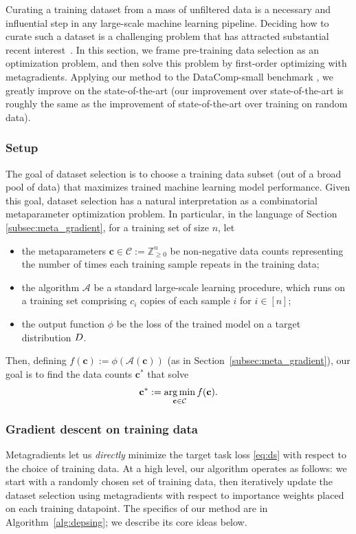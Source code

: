 Curating a training dataset from a mass of unfiltered data is a necessary and
influential step in any large-scale machine learning pipeline. Deciding how to
curate such a dataset is a challenging problem that has attracted substantial
recent
interest~\citep{fang2022data,abbas2023semdedup,engstrom2024dsdm,gadre2024datacomp}.
In this section, we frame pre-training data selection as an optimization
problem, and then solve this problem by first-order optimizing with
metagradients. Applying our method to the DataComp-small benchmark
\citep{gadre2024datacomp}, we greatly improve on the state-of-the-art (our
  improvement over state-of-the-art is roughly the same as the
improvement of state-of-the-art over training on random data).

\subsubsection{Setup}
The goal of {dataset selection} is to choose a training data subset (out of
a broad pool of data) that maximizes trained machine learning model
performance.
Given this goal,
dataset selection has a natural interpretation as a
combinatorial metaparameter optimization problem.
In particular, in the language of Section \ref{subsec:meta_gradient},
for a training set of size $n$, let
\begin{itemize}
  \item[(a)] the metaparameters $\mathbf{c} \in \mathcal{C} :=
    \mathbb{Z}_{\geq 0}^n$ be non-negative data counts representing
    the number of times each training sample repeats in the training data;
  \item[(b)] the algorithm $\mathcal{A}$ be a standard large-scale
    learning procedure, which runs on a training set
    comprising $c_i$ copies of each sample $i$ for $i \in [n]$;
  \item[(c)] the output function $\phi$ be the loss of the trained model on a target
    distribution $D{}$.
\end{itemize}
Then, defining $f(\mathbf{c}) := \phi(\mathcal{A}(\mathbf{c}))$ (as
in Section~\ref{subsec:meta_gradient}),
our goal is to find the data counts $\mathbf{c^*}$ that solve
\begin{equation}
  \label{eq:ds}
  \mathbf{c}^* := \operatorname*{arg\,min}_{\mathbf{c} \in \mathcal{C}} f(\mathbf{c}).
\end{equation}

\subsubsection{Gradient descent on training data}
\label{sec:gdod}
Metagradients let us \textit{directly} minimize the target task
loss \eqref{eq:ds}
with respect to the choice of training data.
At a high level, our algorithm operates as follows:
we start with a randomly chosen set of training data, then
iteratively update the dataset selection using
metagradients with respect to importance weights
placed on each training datapoint.
The specifics of our method are in Algorithm~\ref{alg:depsing};
we describe its core ideas below.


